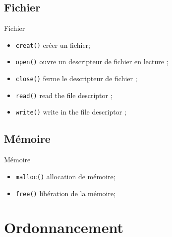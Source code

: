 \begin{frame}{\sectitle}
\def\subsectitle{Fichier}
\subsection{\subsectitle}

\begin{exampleblock}{\subsectitle}
\begin{itemize}
    \item \texttt{creat()} créer un fichier;
    \item \texttt{open()} ouvre un descripteur de fichier en lecture ;
    \item \texttt{close()} ferme le descripteur de fichier ;
    \item \texttt{read()} read the file descriptor ;
    \item \texttt{write()} write in the file descriptor ;
\end{itemize}
\end{exampleblock}

\def\subsectitle{Mémoire}
\subsection{\subsectitle}

\begin{exampleblock}{\subsectitle}
\begin{itemize}
    \item \texttt{malloc()} allocation de mémoire;
    \item \texttt{free()} libération de la mémoire;
\end{itemize}
\end{exampleblock}

\end{frame}

\def\sectitle{Ordonnancement}
\section{\sectitle}

